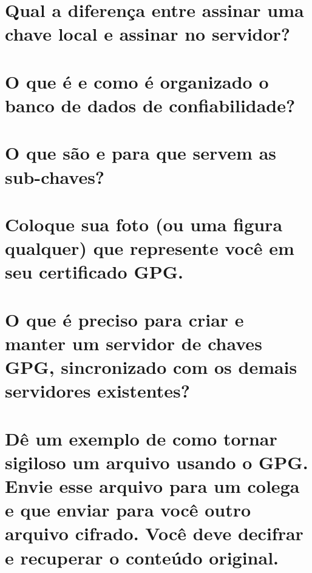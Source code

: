 \documentclass[
    article,            %
    11pt,               %
    oneside,            %
    a4paper,            %
    english,            %
    brazil,             %
    sumario=tradicional,
    ]{abntex2}
\begin{document}
\section{Qual a diferença entre assinar uma chave local e assinar no servidor?}


\section{O que é e como é organizado o banco de dados de confiabilidade?}


\section{O que são e para que servem as sub-chaves?}


\section{Coloque sua foto (ou uma figura qualquer) que represente você em seu certificado GPG.}


\section{O que é preciso para criar e manter um servidor de chaves GPG, sincronizado com os demais servidores existentes?}


\section{Dê um exemplo de como tornar sigiloso um arquivo usando o GPG. Envie esse arquivo para um colega e que enviar para você outro arquivo cifrado. Você deve decifrar e recuperar o conteúdo original.}
\end{document}
